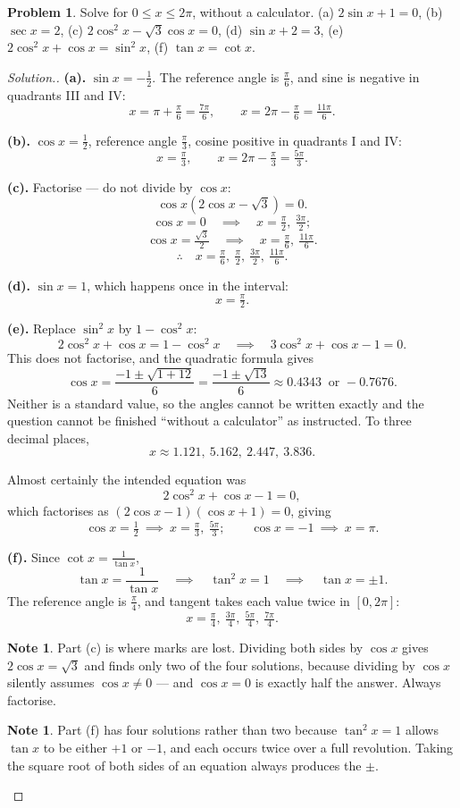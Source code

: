 \documentclass[11pt,a4paper]{article}
\theoremstyle{definition}
\newtheorem{note}[thm]{Note}
\newtheorem{problemx}{Problem}[section]
\newenvironment{problem}{\begin{problemx}}{\end{problemx}}
\newenvironment{solution}
  {\renewcommand{\qedsymbol}{}\begin{proof}[\textit{Solution}.]}
  {\end{proof}}
\begin{document}
\begin{problem}
Solve for $0\leq x\leq 2\pi$, without a calculator.
\quad (a) $2\sin x+1=0$, \quad (b) $\sec x=2$, \quad
(c) $2\cos^2x-\sqrt{3}\cos x=0$, \quad (d) $\sin x+2=3$, \quad
(e) $2\cos^2x+\cos x=\sin^2x$, \quad (f) $\tan x=\cot x$.
\end{problem}

\begin{solution}
\textbf{(a).} $\sin x=-\frac{1}{2}$. The reference angle is $\frac{\pi}{6}$, and sine is
negative in quadrants III and IV:
$$x=\pi+\tfrac{\pi}{6}=\tfrac{7\pi}{6},\qquad x=2\pi-\tfrac{\pi}{6}=\tfrac{11\pi}{6}.$$

\textbf{(b).} $\cos x=\frac{1}{2}$, reference angle $\frac{\pi}{3}$, cosine positive in
quadrants I and IV:
$$x=\tfrac{\pi}{3},\qquad x=2\pi-\tfrac{\pi}{3}=\tfrac{5\pi}{3}.$$

\textbf{(c).} Factorise --- do not divide by $\cos x$:
$$\cos x\left(2\cos x-\sqrt{3}\right)=0.$$
$$\cos x=0\quad\implies\quad x=\tfrac{\pi}{2},\ \tfrac{3\pi}{2};$$
$$\cos x=\tfrac{\sqrt{3}}{2}\quad\implies\quad x=\tfrac{\pi}{6},\ \tfrac{11\pi}{6}.$$
$$\therefore\quad x=\tfrac{\pi}{6},\ \tfrac{\pi}{2},\ \tfrac{3\pi}{2},\
\tfrac{11\pi}{6}.$$

\textbf{(d).} $\sin x=1$, which happens once in the interval:
$$x=\tfrac{\pi}{2}.$$

\textbf{(e).} Replace $\sin^2x$ by $1-\cos^2x$:
$$2\cos^2x+\cos x=1-\cos^2x\quad\implies\quad 3\cos^2x+\cos x-1=0.$$
This does not factorise, and the quadratic formula gives
$$\cos x=\frac{-1\pm\sqrt{1+12}}{6}=\frac{-1\pm\sqrt{13}}{6}
\approx 0.4343\ \text{ or } -0.7676.$$
Neither is a standard value, so the angles cannot be written exactly and the question
cannot be finished ``without a calculator'' as instructed. To three decimal places,
$$x\approx 1.121,\ 5.162,\ 2.447,\ 3.836.$$

Almost certainly the intended equation was
$$2\cos^2x+\cos x-1=0,$$
which factorises as $(2\cos x-1)(\cos x+1)=0$, giving
$$\cos x=\tfrac{1}{2}\ \implies\ x=\tfrac{\pi}{3},\ \tfrac{5\pi}{3};\qquad
\cos x=-1\ \implies\ x=\pi.$$

\textbf{(f).} Since $\cot x=\frac{1}{\tan x}$,
$$\tan x=\frac{1}{\tan x}\quad\implies\quad \tan^2x=1\quad\implies\quad
\tan x=\pm 1.$$
The reference angle is $\frac{\pi}{4}$, and tangent takes each value twice in
$[0,2\pi]$:
$$x=\tfrac{\pi}{4},\ \tfrac{3\pi}{4},\ \tfrac{5\pi}{4},\ \tfrac{7\pi}{4}.$$

\begin{note}
Part (c) is where marks are lost. Dividing both sides by $\cos x$ gives
$2\cos x=\sqrt{3}$ and finds only two of the four solutions, because dividing by
$\cos x$ silently assumes $\cos x\neq 0$ --- and $\cos x=0$ is exactly half the answer.
Always factorise.
\end{note}

\begin{note}
Part (f) has four solutions rather than two because $\tan^2x=1$ allows $\tan x$ to be
either $+1$ or $-1$, and each occurs twice over a full revolution. Taking the square
root of both sides of an equation always produces the $\pm$.
\end{note}
\end{solution}
\end{document}
